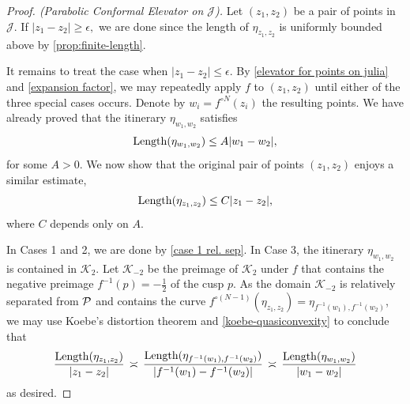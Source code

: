 \begin{proof}[Proof. (Parabolic Conformal Elevator on $\mathcal J$)] \label{parabolic-elevator}
Let  $(z_1,z_2)$ be a pair of points in $\mathcal J$. 
If $|z_{1}-z_{2}| \geq \epsilon,$ 
we are done since the length of $\eta_{z_1,z_2}$ is uniformly bounded above by  \cref{prop:finite-length}.

It remains to treat the case when $|z_{1}-z_{2}| \le \epsilon$. By  \cref{elevator for points on julia} and \cref{expansion factor}, we may repeatedly apply $f$ to $(z_1, z_2)$ until either of the three special cases occurs.
Denote by $w_i=f^{\circ N}(z_i)$ the resulting points. We have already proved that the itinerary $\eta_{w_1,w_2}$ satisfies
\begin{equation*}
	\operatorname{Length}(\eta_{w_1,w_2}) \leq A |w_1-w_2|,
\end{equation*}
for some $A>0$. We now show that the original pair of points $(z_1,z_2)$ enjoys a similar estimate,
\begin{equation*}
	\operatorname{Length}(\eta_{z_1,z_2}) \leq C |z_1-z_2|,
\end{equation*}
where $C$ depends only on $A$.

In Cases 1 and 2, we are done by \cref{case 1 rel. sep}. In Case 3, 
the itinerary $\eta_{w_1,w_2}$ is contained in $\mathcal K_2$. Let $\mathcal K_{-2}$ be the preimage of $\mathcal K_2$ under $f$ that contains the negative preimage $f^{-1}(p)=-\tfrac 12$ of the cusp $p$. 
As the domain $\mathcal K_{-2}$ is relatively separated from $\operatorname{\mathcal P}$ and contains the curve 
$f^{\circ (N-1)}(\eta_{z_1,z_2}) = \eta_{f^{-1}(w_1),f^{-1}(w_2)}$,
we may use Koebe's distortion theorem and \cref{koebe-quasiconvexity} to conclude that
\begin{equation}
	\frac{\operatorname{Length}(\eta_{z_1,z_2})}{|z_1-z_2|} \, \asymp \,
		\frac{\operatorname{Length}(\eta_{f^{-1}(w_1),f^{-1}(w_2)})}{|f^{-1}(w_1)-f^{-1}(w_2)|} \, \asymp \,
		\frac{\operatorname{Length}(\eta_{w_1,w_2})}{|w_1-w_2|}
\end{equation}
as desired.
\end{proof}

% 



